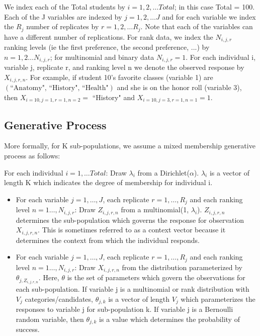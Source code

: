 \documentclass{article}\usepackage[]{graphicx}\usepackage[]{color}
\begin{document}
We index each of the Total students by $i = 1,2, \ldots Total$; in this case Total = 100. Each of the J variables are indexed by $j = 1,2,\ldots J$ and for each variable we index the $R_j$ number of replicates by $r = 1,2,\ldots R_j$. Note that each of the variables can have a different number of replications. For rank data, we index the $N_{i,j,r}$ ranking levels (ie the first preference, the second preference, ...) by $n = 1,2\ldots N_{i,j,r}$; for multinomial and binary data $N_{i,j,r} = 1$. For each individual i, variable j, replicate r, and ranking level n we denote the observed response by $X_{i,j,r,n}$. For example, if student 10's favorite classes (variable 1)  are $ \left(\text{``Anatomy", ``History", ``Health"}\right)$ and she is on the honor roll (variable 3), then $X_{i = 10,j = 1,r = 1,n = 2} =$ ``History" and  $X_{i = 10,j = 3,r = 1,n = 1} = 1$.    

\subsection{Generative Process}\label{generative}
More formally, for K sub-populations, we assume a mixed membership generative process as follows:

\noindent
For each individual $i = 1,\ldots Total$: Draw $\lambda_i$ from a Dirichlet($\alpha$). $\lambda_i$ is a vector of length K which indicates the degree of membership for individual i.
  \begin{itemize}
  \item For each variable $j = 1, \ldots, J$, each replicate $r = 1, \dots, R_j$ and each ranking level $n = 1\ldots, N_{i,j,r}$: Draw $Z_{i,j,r,n}$ from a multinomial(1, $\lambda_i$). $Z_{i,j,r,n}$ determines the sub-population which governs the response for observation $X_{i,j,r,n}$. This is sometimes referred to as a context vector because it determines the context from which the individual responds.
  \item For each variable $j = 1, \ldots, J$, each replicate $r = 1, \dots, R_j$ and each ranking level $n = 1\ldots, N_{i,j,r}$: Draw $X_{i,j,r,n}$ from the distribution parameterized by $\theta_{j,Z_{i,j,r,n}}$. Here, $\theta$ is the set of parameters which govern the observations for each sub-population. If variable j is a multinomial or rank distribution with $V_j$ categories/candidates, $\theta_{j,k}$ is a vector of length $V_j$ which parameterizes the responses to variable j for sub-population k. If variable j is a Bernoulli random variable, then $\theta_{j,k}$ is a value which determines the probability of success. 
  \end{itemize}
  
\end{document}
